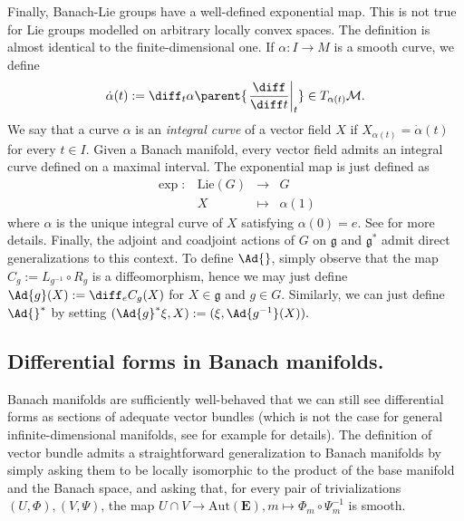  Finally, Banach-Lie groups have a well-defined exponential map. This is not true for Lie groups modelled on arbitrary locally convex spaces. The definition is almost identical to the finite-dimensional one. If \(\alpha\colon I \to M\) is a smooth curve, we define 
 \begin{equation} \label{def_derivative_curve_Banach_manifold}
 \dot{\alpha}(t):=\diff_t\alpha\parent{\left. \frac{\diff}{\diff t} \right|_{t}} \in T_{\alpha(t)}\mathcal{M}.
 \end{equation}
 We say that a curve \(\alpha\) is an \textit{integral curve} of a vector field \(X\) if \(X_{\alpha(t)}=\dot{\alpha}(t)\) for every \(t \in I\). Given a Banach manifold, every vector field admits an integral curve defined on a maximal interval. The exponential map is just defined as
 \[
 \begin{array}{cccc}
    \exp \colon & \mathrm{Lie}(G) & \longrightarrow & G \\
    & X & \mapsto & \alpha(1)
 \end{array}
 \]
 where \(\alpha\) is the unique integral curve of \(X\) satisfying \(\alpha(0)=e\). See \parencite{Dodson_Galanis_Vassiliou_2015} for more details. Finally, the adjoint and coadjoint actions of \(G\) on \(\mathfrak{g}\) and \(\mathfrak{g}^*\) admit direct generalizations to this context. To define \(\Ad{}\), simply observe that the map \(C_g:=L_{g^{-1}} \circ R_g\) is a diffeomorphism, hence we may just define \(\Ad{g}(X):=\diff_e C_g(X)\) for \(X \in \mathfrak{g}\) and \(g \in G\). Similarly, we can just define \(\Ad{}^*\) by setting \((\Ad{g}^* \xi, X) :=(\xi, \Ad{g^{-1}}(X)).\)

\subsection{Differential forms in Banach manifolds.}
Banach manifolds are sufficiently well-behaved that we can still see differential forms as sections of adequate vector bundles (which is not the case for general infinite-dimensional manifolds, see for example \parencite[Appendix E]{Schmeding_2022} for details). The definition of vector bundle admits a straightforward generalization to Banach manifolds by simply asking them to be locally isomorphic to the product of the base manifold and the Banach space, and asking that, for every pair of trivializations \((U, \Phi), (V, \Psi)\), the map \(U \cap V\to \mathrm{Aut}(\mathbf{E}), m \mapsto \Phi_m \circ \Psi^{-1}_m \) is smooth.

